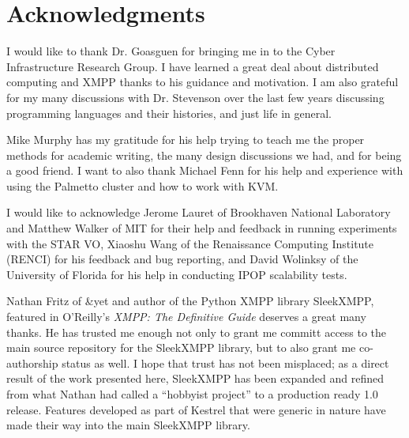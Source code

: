 \chapter*{Acknowledgments}

I would like to thank Dr. Goasguen for bringing me in to the Cyber Infrastructure
Research Group. I have learned a great deal about distributed computing and XMPP
thanks to his guidance and motivation. I am also grateful for my many discussions
with Dr. Stevenson over the last few years discussing programming languages and
their histories, and just life in general.

Mike Murphy has my gratitude for his help trying to teach me the proper methods
for academic writing, the many design discussions we had, and for being a good
friend. I want to also thank Michael Fenn for his help and experience with using
the Palmetto cluster and how to work with KVM.

I would like to acknowledge Jerome Lauret of Brookhaven National Laboratory and
Matthew Walker of MIT for their help and feedback in running experiments with
the STAR VO, Xiaoshu Wang of the Renaissance Computing Institute (RENCI) for his
feedback and bug reporting, and David Wolinksy of the University of Florida for
his help in conducting IPOP scalability tests.

Nathan Fritz of \&yet and author of the Python XMPP library SleekXMPP, featured
in O'Reilly's \textit{XMPP: The Definitive Guide} deserves a great many thanks.
He has trusted me enough not only to grant me committ access to the main source
repository for the SleekXMPP library, but to also grant me co-authorship status as
well. I hope that trust has not been misplaced; as a direct result of the work
presented here, SleekXMPP has been expanded and refined from what Nathan had
called a ``hobbyist project'' to a production ready 1.0 release. Features developed
as part of Kestrel that were generic in nature have made their way into the main
SleekXMPP library.

